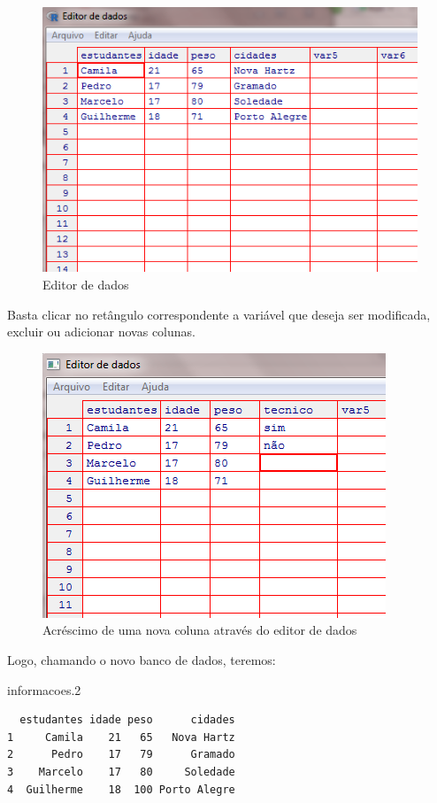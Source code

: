 \documentclass[12pt,brazil,oneside]{book}
\newenvironment{Shaded}{\begin{snugshade}}{\end{snugshade}}
\newcommand{\FloatTok}[1]{\textcolor[rgb]{0.00,0.00,0.81}{#1}}
\newcommand{\NormalTok}[1]{#1}
\begin{document}
\begin{figure}[H]

{\centering \includegraphics[width=0.6\linewidth]{95} 

}

\caption{Editor de dados}\label{fig:95}
\end{figure}

Basta clicar no retângulo correspondente a variável que deseja ser
modificada, excluir ou adicionar novas colunas.

\begin{figure}[H]

{\centering \includegraphics[width=0.6\linewidth]{10} 

}

\caption{Acréscimo de uma nova coluna através do editor de dados}\label{fig:10}
\end{figure}

Logo, chamando o novo banco de dados, teremos:

\begin{Shaded}
\begin{Highlighting}[]
\NormalTok{informacoes}\FloatTok{.2} 
\end{Highlighting}
\end{Shaded}

\begin{verbatim}
  estudantes idade peso      cidades
1     Camila    21   65   Nova Hartz
2      Pedro    17   79      Gramado
3    Marcelo    17   80     Soledade
4  Guilherme    18  100 Porto Alegre
\end{verbatim}
\end{document}
